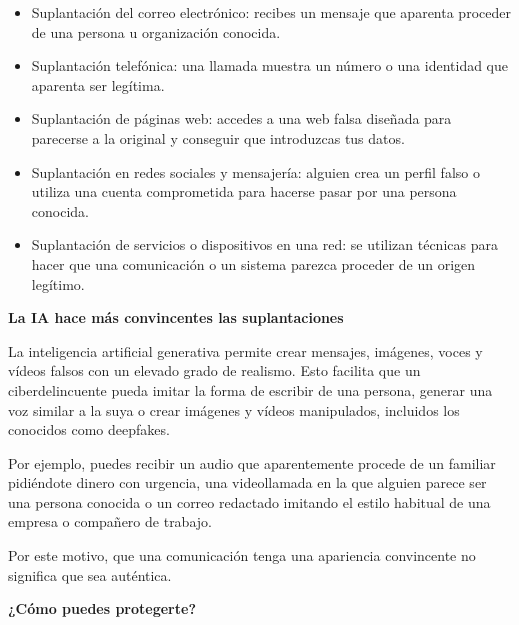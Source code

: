 \documentclass[
  spanish,
  a4paper,
  openany]{book}
\begin{document}
\begin{itemize}
\item
  Suplantación del correo electrónico: recibes un mensaje que aparenta proceder de una persona u organización conocida.
\item
  Suplantación telefónica: una llamada muestra un número o una identidad que aparenta ser legítima.
\item
  Suplantación de páginas web: accedes a una web falsa diseñada para parecerse a la original y conseguir que introduzcas tus datos.
\item
  Suplantación en redes sociales y mensajería: alguien crea un perfil falso o utiliza una cuenta comprometida para hacerse pasar por una persona conocida.
\item
  Suplantación de servicios o dispositivos en una red: se utilizan técnicas para hacer que una comunicación o un sistema parezca proceder de un origen legítimo.
\end{itemize}

\textbf{La IA hace más convincentes las suplantaciones}

La inteligencia artificial generativa permite crear mensajes, imágenes, voces y vídeos falsos con un elevado grado de realismo. Esto facilita que un ciberdelincuente pueda imitar la forma de escribir de una persona, generar una voz similar a la suya o crear imágenes y vídeos manipulados, incluidos los conocidos como deepfakes.

Por ejemplo, puedes recibir un audio que aparentemente procede de un familiar pidiéndote dinero con urgencia, una videollamada en la que alguien parece ser una persona conocida o un correo redactado imitando el estilo habitual de una empresa o compañero de trabajo.

Por este motivo, que una comunicación tenga una apariencia convincente no significa que sea auténtica.

\textbf{¿Cómo puedes protegerte?}
\end{document}
